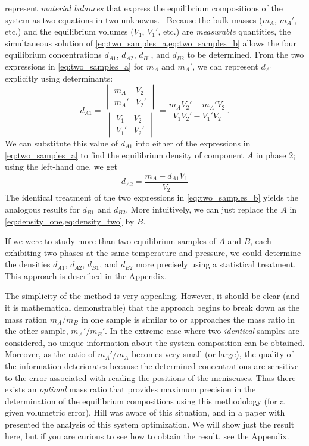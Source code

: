  represent \emph{material balances} that express the equilibrium compositions of the  system as two equations in two unknowns.~\cite{hill1926mutual}
Because the bulk masses (\(m_A\), \(m_A'\), etc.) and the equilibrium volumes (\(V_1\), \(V_1'\), etc.) are \emph{measurable} quantities, the simultaneous solution of \cref{eq:two_samples_a,eq:two_samples_b} allows the four equilibrium concentrations \(d_{A1}\), \(d_{A2}\), \(d_{B1}\), and \(d_{B2}\) to be determined. 
From the two expressions in \cref{eq:two_samples_a} for \(m_A\) and \(m_A'\), we can represent \(d_{A1}\) explicitly using determinants: 
\begin{equation}
	d_{A1} = \frac{
				\begin{vmatrix}
					m_A  & V_2\\
					m_A' & V_2'
				\end{vmatrix}}
				{\begin{vmatrix}
					V_1  & V_2\\
					V_1' & V_2'
				\end{vmatrix}} = \frac{m_A V_2' - m_A' V_2}{V_1 V_2' - V_1' V_2} \,.
	\label{eq:density_one}
\end{equation}
We can substitute this value of \(d_{A1}\) into either of the expressions in \cref{eq:two_samples_a} to find the equilibrium density of component \(A\) in phase 2; using the left-hand one, we get 
\begin{equation}
	d_{A2} = \frac{m_A - d_{A1} V_1}{V_2}
	\label{eq:density_two}
\end{equation}
The identical treatment of the two expressions in \cref{eq:two_samples_b} yields the analogous results for \(d_{B1}\) and \(d_{B2}\). 
More intuitively, we can just replace the \(A\) in \cref{eq:density_one,eq:density_two} by \(B\). 

If we were to study more than two equilibrium samples of \(A\) and \(B\), each exhibiting two phases at the same temperature and pressure, we could determine the densities \(d_{A1}\), \(d_{A2}\), \(d_{B1}\), and \(d_{B2}\) more precisely using a statistical treatment. 
This approach is described in the Appendix. 

The simplicity of the method is very appealing. 
However, it should be clear (and it is mathematical demonstrable) that the approach begins to break down as the mass ration \(m_A/m_B\) in one sample is similar to or approaches the mass ratio in the other sample, \(m_A'/m_B'\). 
In the extreme case where two \emph{identical} samples are considered, no unique information about the system composition can be obtained. 
Moreover, as the ratio of \(m_A'/m_A\) becomes very small (or large), the quality of the information deteriorates because the determined concentrations are sensitive to the error associated with reading the positions of the meniscuses. 
Thus there exists an \emph{optimal} mass ratio that provides maximum precision in the determination of the equilibrium compositions using this methodology (for a given volumetric error). 
Hill was aware of this situation, and in a paper with \textcite{hill1926mutual} presented the analysis of this system optimization. 
We will show just the result here, but if you are curious to see how to obtain the result, see the Appendix. 

